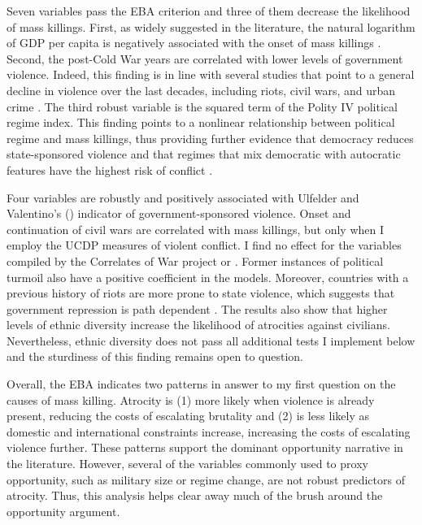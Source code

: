 Seven variables pass the EBA criterion and three of them decrease the likelihood of mass killings. First, as widely suggested in the literature, the natural logarithm of GDP per capita is negatively associated with the onset of mass killings \citep[e.g.,][]{besanccon2005relative, easterly2006development,esteban2015strategic}. Second, the post-Cold War years are correlated with lower levels of government violence. Indeed, this finding is in line with several studies that point to a general decline in violence over the last decades, including riots, civil wars, and urban crime \citep{pinker2011better,straus2012wars,valentino2014we}. The third robust variable is the squared term of the Polity IV political regime index. This finding points to a nonlinear relationship between political regime and mass killings, thus providing further evidence that democracy reduces state-sponsored violence \citep{rost2013will,rummel1995democracy} and that regimes that mix democratic with autocratic features have the highest risk of conflict \citep{hegre2001toward,muchlinski2014grievances}.
	
Four variables are robustly and positively associated with Ulfelder and Valentino's (\citeyear{ulfelder2008assessing}) indicator of government-sponsored violence. Onset and continuation of civil wars are correlated with mass killings, but only when I employ the UCDP measures of violent conflict. I find no effect for the variables compiled by the Correlates of War project or \cite{cederman2010ethnic}. Former instances of political turmoil also have a positive coefficient in the models. Moreover, countries with a previous history of riots are more prone to state violence, which suggests that government repression is path dependent \citep[e.g.,][]{gurr2000peoples,harff2003no,krain1997state,nyseth2017re}. The results also show that higher levels of ethnic diversity increase the likelihood of atrocities against civilians. Nevertheless, ethnic diversity does not pass all additional tests I implement below and the sturdiness of this finding remains open to question.

Overall, the EBA indicates two patterns in answer to my first question on the causes of mass killing. Atrocity is (1) more likely when violence is already present, reducing the costs of escalating brutality and (2) is less likely as domestic and international constraints increase, increasing the costs of escalating violence further. These patterns support the dominant opportunity narrative in the literature. However, several of the variables commonly used to proxy opportunity, such as military size or regime change, are not robust predictors of atrocity. Thus, this analysis helps clear away much of the brush around the opportunity argument.

